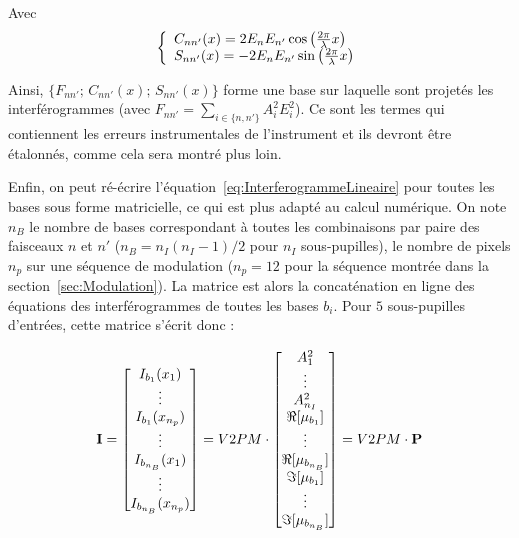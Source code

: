 Avec
\begin{align}
    \left\{
    \begin{array}{r@{}l}\displaystyle
    &C_{nn'}(x) = 2E_n E_{n'}\cos \left( \frac{2 \pi}{\lambda}x \right) \\
    &S_{nn'}(x) = -2E_n E_{n'}\sin \left( \frac{2 \pi}{\lambda}x \right)
    \end{array}\right. \label{eq:V2PMtermesComplexes}
\end{align}

Ainsi, $\{ F_{nn'} \text{; } C_{nn'}(x) \text{; } S_{nn'}(x)  \}$ forme une base sur laquelle sont projetés les interférogrammes (avec $F_{nn'} = \sum_{i \in \{n,n'\}} A_{i}^{2} E_{i}^{2}$). Ce sont les termes qui contiennent les erreurs instrumentales de l'instrument et ils devront être étalonnés, comme cela sera montré plus loin.

Enfin, on peut ré-écrire l'équation~\ref{eq:InterferogrammeLineaire} pour toutes les bases sous forme matricielle, ce qui est plus adapté au calcul numérique. On note $n_B$ le nombre de bases correspondant à toutes les combinaisons par paire des faisceaux $n$ et $n'$ ($n_B = n_I(n_I-1)/2$ pour $n_I$ sous-pupilles), le nombre de pixels $n_p$ sur une séquence de modulation ($n_p = 12$ pour la séquence montrée dans la section~\ref{sec:Modulation}). La matrice est alors la concaténation en ligne des équations des interférogrammes de toutes les bases $b_i$. Pour $5$ sous-pupilles d'entrées, cette matrice s'écrit donc :

\begin{align}
    \text{\textbf{I}}=
    \begin{bmatrix}
    	I_{b_1}(x_1) \\
    	\vdots \\
    	I_{b_1}(x_{n_p}) \\
    	\vdots \\
    	I_{b_{n_B}}(x_1) \\
    	\vdots \\
    	I_{b_{n_B}}(x_{n_p})
    \end{bmatrix}
    = V2PM \cdot
    \begin{bmatrix}
        A_{1}^2 \\
        \vdots \\
        A_{n_I}^2 \\
        \Re [\mu_{b_1}] \\
        \vdots \\
        \Re [\mu_{b_{n_B}}] \\
        \Im [\mu_{b_1}] \\
        \vdots \\
        \Im [\mu_{b_{n_B}}]
    \end{bmatrix}
    =V2PM\cdot\text{\textbf{P}} \label{eq:IV2PMP}
\end{align}

